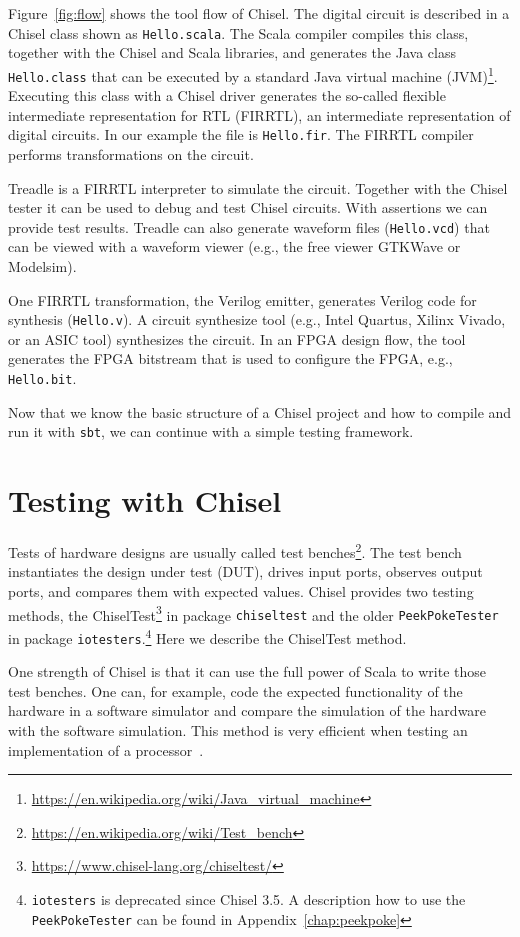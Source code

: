 \documentclass[%
    10pt,
    headinclude, footexclude,
    openright, %
    notitlepage,
    cleardoubleempty,
    headsepline,
    pointlessnumbers,
    bibtotoc, idxtotoc,
    ]{scrbook}
\newcommand{\code}[1]{{\small{\texttt{#1}}}}
\newcommand{\codefoot}[1]{{\footnotesize{\texttt{#1}}}}
\newcommand{\myref}[2]{\href{#1}{#2}}
\renewcommand{\myref}[2]{{#2}{\footnote{\url{#1}}}}
\begin{document}
Figure~\ref{fig:flow} shows the tool flow of Chisel. The digital circuit is described in a Chisel class
shown as \code{Hello.scala}. The Scala compiler compiles this class, together with the Chisel and Scala
libraries, and generates the Java class \code{Hello.class} that can be executed by a standard
\myref{https://en.wikipedia.org/wiki/Java_virtual_machine}{Java virtual machine (JVM)}.
Executing this class with a Chisel driver generates the so-called flexible intermediate representation for
RTL (FIRRTL), an intermediate representation of digital circuits. In our example the file is \code{Hello.fir}.
The FIRRTL compiler performs transformations on the circuit.

Treadle is a FIRRTL interpreter to simulate the circuit. Together with the Chisel tester it can be
used to debug and test Chisel circuits. With assertions we can provide test results.
Treadle can also generate waveform files (\code{Hello.vcd}) that can be viewed with
a waveform viewer (e.g., the free viewer GTKWave or Modelsim).

One FIRRTL transformation, the Verilog emitter, generates Verilog code for synthesis (\code{Hello.v}).
A circuit synthesize tool (e.g., Intel Quartus, Xilinx Vivado, or an ASIC tool) synthesizes the circuit.
In an FPGA design flow, the tool generates the FPGA bitstream that is used to configure the FPGA,
e.g., \code{Hello.bit}.

Now that we know the basic structure of a Chisel project and how to compile and run it
with \code{sbt}, we can continue with a simple testing framework.


\section{Testing with Chisel}

Tests of hardware designs are usually called \myref{https://en.wikipedia.org/wiki/Test_bench}{test benches}.
The test bench instantiates the design under test (DUT), drives input ports, observes output ports,
and compares them with expected values.
Chisel provides two testing methods, the \myref{https://www.chisel-lang.org/chiseltest/}{ChiselTest}
in package \code{chiseltest} and the older \code{PeekPokeTester} in package
\code{iotesters}.\footnote{\codefoot{iotesters} is deprecated since Chisel 3.5.
A description how to use the \codefoot{PeekPokeTester} can be found in Appendix~\ref{chap:peekpoke}}
Here we describe the ChiselTest method.

One strength of Chisel is that it can use the full power of Scala to write those
test benches. One can, for example, code the expected functionality of the hardware
in a software simulator and compare the simulation of the hardware with the
software simulation. This method is very efficient when testing an implementation
of a processor~\cite{lipsi:arcs2018}.
\end{document}

